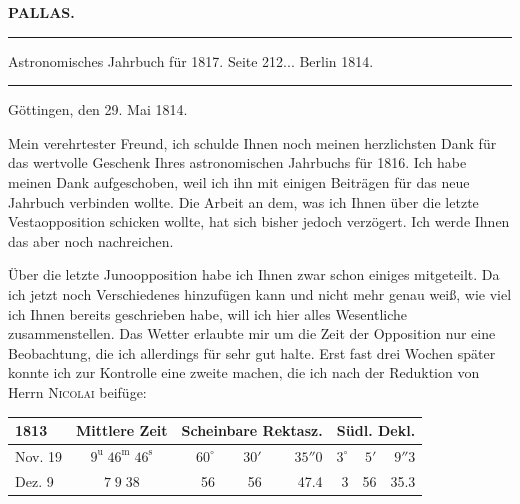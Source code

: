 \clearpage{}
\begin{center}\textbf{PALLAS.}\par\vspace{4pt}\hrule\vspace{4pt}\fontsize{10}{12}\selectfont Astronomisches Jahrbuch für 1817. Seite 212\;... Berlin 1814.\par\vspace{4pt}\hrule\vspace{4pt}\end{center}

\begin{flushright}
Göttingen, den 29. Mai 1814.
\end{flushright}

\par\indent Mein verehrtester Freund, ich schulde Ihnen noch meinen herzlichsten Dank für das wertvolle Geschenk Ihres astronomischen Jahrbuchs für 1816. Ich habe meinen Dank aufgeschoben, weil ich ihn mit einigen Beiträgen für das neue Jahrbuch verbinden wollte. Die Arbeit an dem, was ich Ihnen über die letzte Vestaopposition schicken wollte, hat sich bisher jedoch verzögert. Ich werde Ihnen das aber noch nachreichen.

\par\indent Über die letzte Junoopposition habe ich Ihnen zwar schon einiges mitgeteilt. Da ich jetzt noch Verschiedenes hinzufügen kann und nicht mehr genau weiß, wie viel ich Ihnen bereits geschrieben habe, will ich hier alles Wesentliche zusammenstellen. Das Wetter erlaubte mir um die Zeit der Opposition nur eine Beobachtung, die ich allerdings für sehr gut halte. Erst fast drei Wochen später konnte ich zur Kontrolle eine zweite machen, die ich nach der Reduktion von Herrn \textsc{Nicolai} beifüge:

\begin{center}\fontsize{10}{12}\selectfont\setlength{\tabcolsep}{3pt}\renewcommand{\arraystretch}{1.15}\begin{tabular}{l|c|rrr|rrr}
1813 & Mittlere Zeit & \multicolumn{3}{c|}{Scheinbare Rektasz.} & \multicolumn{3}{c}{Südl. Dekl.}\\\hline
Nov. 19 & $9^{\mathrm u}\;46^{\mathrm m}\;46^{\mathrm s}$ & $60^\circ$ & $30'$ & $35''0$ & $3^\circ$ & $5'$ & $9''3$\\
Dez. 9 & $7\;9\;38$ & 56 & 56 & 47.4 & 3 & 56 & 35.3\\
\end{tabular}\end{center}

